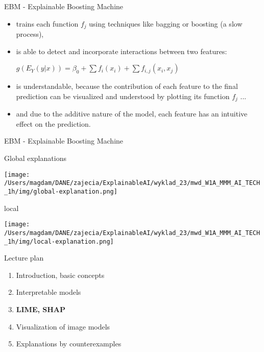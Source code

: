 \documentclass{beamer}
\begin{document}
\begin{frame}{EBM - Explainable Boosting Machine}
\begin{itemize}
\item trains each function $f_j$ using techniques like bagging or boosting (a slow process),
\item is able to detect and incorporate interactions between two features:
\begin{center}
$g(E_Y(y|x)) = \beta_0 + \sum f_i(x_i) + \sum f_{i,j}(x_i, x_j)$
\end{center}
\item is understandable, because the contribution of each feature to the final prediction can be visualized and understood by plotting its function $f_j$ ...
\item and due to the additive nature of the model, each feature has an intuitive effect on the prediction.
\end{itemize}
\end{frame}

\begin{frame}{EBM - Explainable Boosting Machine}

Global explanations\\
\begin{center}
\texttt{[image: /Users/magdam/DANE/zajecia/ExplainableAI/wyklad\_23/mwd\_W1A\_MMM\_AI\_TECH\_1h/img/global-explanation.png]} \\

\begin{flushleft}
local\\
\end{flushleft}

\texttt{[image: /Users/magdam/DANE/zajecia/ExplainableAI/wyklad\_23/mwd\_W1A\_MMM\_AI\_TECH\_1h/img/local-explanation.png]} 
\end{center}
\end{frame}

\begin{frame}{Lecture plan}
\begin{enumerate}
\item Introduction, basic concepts
\item Interpretable models
\item \textbf{LIME, SHAP}
\item Visualization of image models
\item Explanations by counterexamples
\end{enumerate}
\end{frame}
\end{document}
